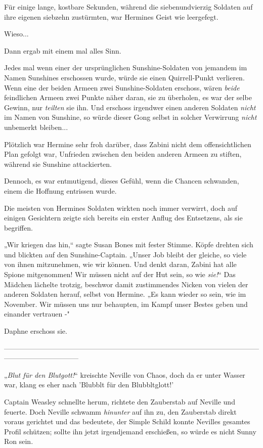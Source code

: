 {\hfill\break Für einige lange, kostbare Sekunden, während die siebenundvierzig Soldaten auf ihre eigenen siebzehn zustürmten, war Hermines Geist wie leergefegt.

Wieso...

Dann ergab mit einem mal alles Sinn.

Jedes mal wenn einer der ursprünglichen Sunshine-Soldaten von jemandem im Namen Sunshines erschossen wurde, würde sie einen Quirrell-Punkt verlieren. Wenn eine der beiden Armeen zwei Sunshine-Soldaten erschoss, wären \emph{beide} feindlichen Armeen zwei Punkte näher daran, sie zu überholen, es war der selbe Gewinn, nur \emph{teilten} sie ihn. Und erschoss irgendwer einen anderen Soldaten \emph{nicht} im Namen von Sunshine, so würde dieser Gong selbst in solcher Verwirrung \emph{nicht} unbemerkt bleiben...

Plötzlich war Hermine sehr froh darüber, dass Zabini nicht dem offensichtlichen Plan gefolgt war, Unfrieden zwischen den beiden anderen Armeen zu stiften, während sie Sunshine attackierten.

Dennoch, es war entmutigend, dieses Gefühl, wenn die Chancen schwanden, einem die Hoffnung entrissen wurde.

Die meisten von Hermines Soldaten wirkten noch immer verwirrt, doch auf einigen Gesichtern zeigte sich bereits ein erster Anflug des Entsetzens, als sie begriffen.

„Wir kriegen das hin,“ sagte Susan Bones mit fester Stimme. Köpfe drehten sich und blickten auf den Sunshine-Captain. „Unser Job bleibt der gleiche, so viele von ihnen mitzunehmen, wie wir können. Und denkt daran, Zabini hat alle Spione mitgenommen! Wir müssen nicht auf der Hut sein, so wie \emph{sie!}“ Das Mädchen lächelte trotzig, beschwor damit zustimmendes Nicken von vielen der anderen Soldaten herauf, selbst von Hermine. „Es kann wieder so sein, wie im November. Wir müssen uns nur behaupten, im Kampf unser Bestes geben und einander vertrauen -"

Daphne erschoss sie.

--------------------------------------------------------------------------------------------------------------------------------------------

\hfill\break „\emph{Blut für den Blutgott!}“ kreischte Neville von Chaos, doch da er unter Wasser war, klang es eher nach 'Blubblt für den Blubbltglott!'

Captain Weasley schnellte herum, richtete den Zauberstab auf Neville und feuerte. Doch Neville schwamm \emph{hinunter} auf ihn zu, den Zauberstab direkt voraus gerichtet und das bedeutete, der Simple Schild konnte Nevilles gesamtes Profil schützen; sollte ihn jetzt irgendjemand erschießen, so würde es nicht Sunny Ron sein.

}

